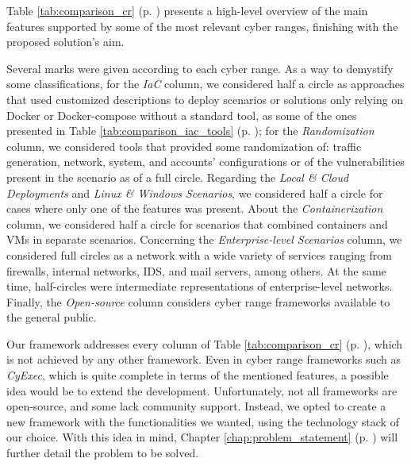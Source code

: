 Table \ref{tab:comparison_cr} (p. \pageref{tab:comparison_cr}) presents a high-level overview of the main features supported by some of the most relevant cyber ranges, finishing with the proposed solution's aim.

Several marks were given according to each cyber range. As a way to demystify some classifications, for the \textit{IaC} column, we considered half a circle as approaches that used customized descriptions to deploy scenarios or solutions only relying on Docker or Docker-compose without a standard tool, as some of the ones presented in Table \ref{tab:comparison_iac_tools} (p. \pageref{tab:comparison_iac_tools}); for the \textit{Randomization} column, we considered tools that provided some randomization of: traffic generation, network, system, and accounts' configurations or of the vulnerabilities present in the scenario as of a full circle. Regarding the \textit{Local \& Cloud Deployments} and \textit{Linux \& Windows Scenarios}, we considered half a circle for cases where only one of the features was present. About the \textit{Containerization} column, we considered half a circle for scenarios that combined containers and VMs in separate scenarios. Concerning the \textit{Enterprise-level Scenarios} column, we considered full circles as a network with a wide variety of services ranging from firewalls, internal networks, IDS, and mail servers, among others. At the same time, half-circles were intermediate representations of enterprise-level networks. Finally, the \textit{Open-source} column considers cyber range frameworks available to the general public.

Our framework addresses every column of Table \ref{tab:comparison_cr} (p. \pageref{tab:comparison_cr}), which is not achieved by any other framework. Even in cyber range frameworks such as \textit{CyExec}, which is quite complete in terms of the mentioned features, a possible idea would be to extend the development. Unfortunately, not all frameworks are open-source, and some lack community support. Instead, we opted to create a new framework with the functionalities we wanted, using the technology stack of our choice. With this idea in mind, Chapter \ref{chap:problem_statement} (p. \pageref{chap:problem_statement}) will further detail the problem to be solved.